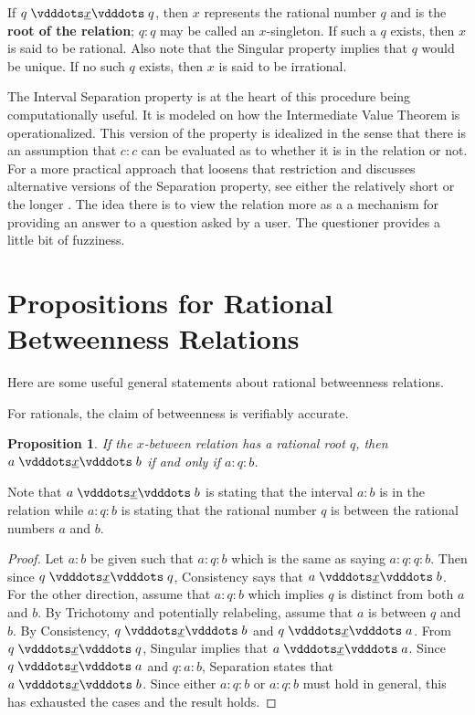 \documentclass[12pt]{article}
\newtheorem{proposition}{Proposition}[section]
\begin{document}
If $q \xrel q$, then $x$ represents the rational number $q$ and is the \textbf{root of the relation}; $q:q$ may be called an $x$-singleton. If such a $q$ exists, then $x$ is said to be rational. Also note that the Singular property implies that $q$ would be unique. If no such $q$ exists, then $x$ is said to be irrational. 

The Interval Separation property is at the heart of this procedure being computationally useful. It is modeled on how the Intermediate Value Theorem is operationalized. This version of the property is idealized in the sense that there is an assumption that $c:c$ can be evaluated as to whether it is in the relation or not. For a more practical approach that loosens that restriction and discusses alternative versions of the Separation property, see either the relatively short \cite{taylor24oraclerbr} or the longer \cite{taylor23main}. The idea there is to view the relation more as a a mechanism for providing an answer to a question asked by a user. The questioner provides a little bit of fuzziness. 


\section{Propositions for Rational Betweenness Relations}

Here are some useful general statements about rational betweenness relations. 

For rationals, the claim of betweenness is verifiably accurate. 

\begin{proposition}\label{br:rooted}
    If the $x$-between relation has a rational root $q$, then $a \xrel b$ if and only if $a : q : b$.
\end{proposition}

Note that $a \xrel b$ is stating that the interval $a:b$ is in the relation while $a:q:b$ is stating that the rational number $q$ is between the rational numbers $a$ and $b$.

\begin{proof}
    Let $a : b$ be given such that $a : q : b$ which is the same as saying $a:q:q:b$. Then since $q \xrel q$, Consistency says that $a \xrel b$. For the other direction, assume that \sout{$a:q:b$} which implies $q$ is distinct from both $a$ and $b$. By Trichotomy and potentially relabeling, assume that $a$ is between $q$ and $b$. By Consistency, $q \xrel b$ and $q\xrel a$.  From $q \xrel q$, Singular implies that \sout{$a \xrel a$}. Since $q \xrel a$ and $q:a:b$, Separation states that \sout{$ a \xrel b$}. Since either $a:q:b$ or \sout{$a:q:b$} must hold in general, this has exhausted the cases and the result holds.  
\end{proof}
\end{document}
